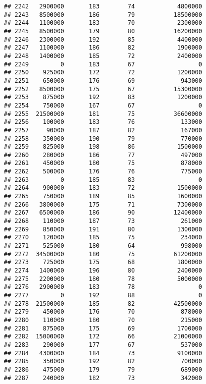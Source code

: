 \documentclass[
]{article}
\begin{document}
\begin{verbatim}
## 2242   2900000       183        74            4800000
## 2243   8500000       186        79           18500000
## 2244   1100000       183        70            2300000
## 2245   8500000       179        80           16200000
## 2246   2300000       192        85            4400000
## 2247   1100000       186        82            1900000
## 2248   1400000       185        72            2400000
## 2249         0       183        67                  0
## 2250    925000       172        72            1200000
## 2251    650000       176        69             943000
## 2252   8500000       175        67           15300000
## 2253    875000       192        83            1200000
## 2254    750000       167        67                  0
## 2255  21500000       181        75           36600000
## 2256    100000       183        76             133000
## 2257     90000       187        82             167000
## 2258    350000       190        79             770000
## 2259    825000       198        86            1500000
## 2260    280000       186        77             497000
## 2261    450000       180        75             878000
## 2262    500000       176        76             775000
## 2263         0       185        83                  0
## 2264    900000       183        72            1500000
## 2265    750000       189        85            1600000
## 2266   3800000       175        71            7300000
## 2267   6500000       186        90           12400000
## 2268    110000       187        73             261000
## 2269    850000       191        80            1300000
## 2270    120000       185        75             234000
## 2271    525000       180        64             998000
## 2272  34500000       180        75           61200000
## 2273    725000       175        68            1800000
## 2274   1400000       196        80            2400000
## 2275   2200000       180        78            5000000
## 2276   2900000       183        78                  0
## 2277         0       192        88                  0
## 2278  21500000       185        82           42500000
## 2279    450000       176        70             878000
## 2280    110000       180        70             215000
## 2281    875000       175        69            1700000
## 2282  15000000       172        66           21000000
## 2283    290000       177        67             537000
## 2284   4300000       184        73            9100000
## 2285    350000       192        82             700000
## 2286    475000       179        79             689000
## 2287    240000       182        73             342000

\end{verbatim}
\end{document}
